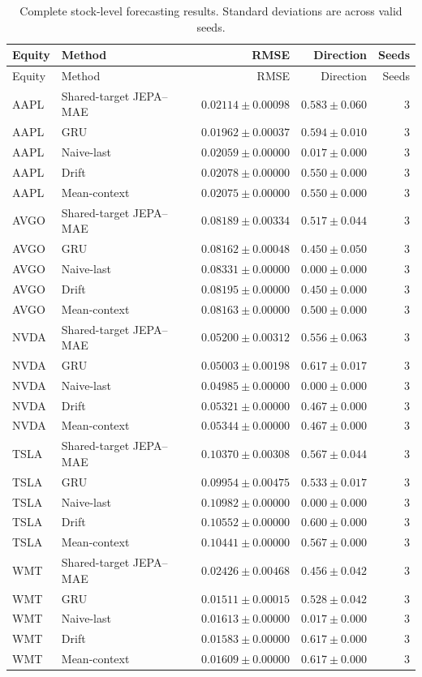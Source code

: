 \begin{longtable}{llrrr}
\caption{Complete stock-level forecasting results. Standard deviations are across valid seeds.}\label{tab:appendix_stock_metrics}\\
\toprule
Equity & Method & RMSE & Direction & Seeds \\
\midrule
\endfirsthead
\toprule
Equity & Method & RMSE & Direction & Seeds \\
\midrule
\endhead
AAPL & Shared-target JEPA--MAE & $0.02114 \pm 0.00098$ & $0.583 \pm 0.060$ & 3 \\
AAPL & GRU & $0.01962 \pm 0.00037$ & $0.594 \pm 0.010$ & 3 \\
AAPL & Naive-last & $0.02059 \pm 0.00000$ & $0.017 \pm 0.000$ & 3 \\
AAPL & Drift & $0.02078 \pm 0.00000$ & $0.550 \pm 0.000$ & 3 \\
AAPL & Mean-context & $0.02075 \pm 0.00000$ & $0.550 \pm 0.000$ & 3 \\
AVGO & Shared-target JEPA--MAE & $0.08189 \pm 0.00334$ & $0.517 \pm 0.044$ & 3 \\
AVGO & GRU & $0.08162 \pm 0.00048$ & $0.450 \pm 0.050$ & 3 \\
AVGO & Naive-last & $0.08331 \pm 0.00000$ & $0.000 \pm 0.000$ & 3 \\
AVGO & Drift & $0.08195 \pm 0.00000$ & $0.450 \pm 0.000$ & 3 \\
AVGO & Mean-context & $0.08163 \pm 0.00000$ & $0.500 \pm 0.000$ & 3 \\
NVDA & Shared-target JEPA--MAE & $0.05200 \pm 0.00312$ & $0.556 \pm 0.063$ & 3 \\
NVDA & GRU & $0.05003 \pm 0.00198$ & $0.617 \pm 0.017$ & 3 \\
NVDA & Naive-last & $0.04985 \pm 0.00000$ & $0.000 \pm 0.000$ & 3 \\
NVDA & Drift & $0.05321 \pm 0.00000$ & $0.467 \pm 0.000$ & 3 \\
NVDA & Mean-context & $0.05344 \pm 0.00000$ & $0.467 \pm 0.000$ & 3 \\
TSLA & Shared-target JEPA--MAE & $0.10370 \pm 0.00308$ & $0.567 \pm 0.044$ & 3 \\
TSLA & GRU & $0.09954 \pm 0.00475$ & $0.533 \pm 0.017$ & 3 \\
TSLA & Naive-last & $0.10982 \pm 0.00000$ & $0.000 \pm 0.000$ & 3 \\
TSLA & Drift & $0.10552 \pm 0.00000$ & $0.600 \pm 0.000$ & 3 \\
TSLA & Mean-context & $0.10441 \pm 0.00000$ & $0.567 \pm 0.000$ & 3 \\
WMT & Shared-target JEPA--MAE & $0.02426 \pm 0.00468$ & $0.456 \pm 0.042$ & 3 \\
WMT & GRU & $0.01511 \pm 0.00015$ & $0.528 \pm 0.042$ & 3 \\
WMT & Naive-last & $0.01613 \pm 0.00000$ & $0.017 \pm 0.000$ & 3 \\
WMT & Drift & $0.01583 \pm 0.00000$ & $0.617 \pm 0.000$ & 3 \\
WMT & Mean-context & $0.01609 \pm 0.00000$ & $0.617 \pm 0.000$ & 3 \\
\bottomrule
\end{longtable}
